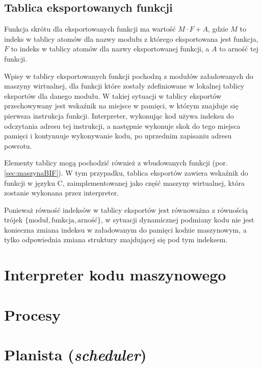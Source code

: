 \subsection{Tablica eksportowanych funkcji}
\label{sub:maszynaTablicaEksportow}

Funkcja skrótu dla eksportowanych funkcji ma wartość $M \cdot F+A$, gdzie $M$ to indeks w tablicy atomów dla nazwy modułu z którego eksportowana jest funkcja, $F$ to indeks w tablicy atomów dla nazwy eksportowanej funkcji, a $A$ to arność tej funkcji.

Wpisy w tablicy eksportowanych funkcji pochodzą z modułów załadowanych do maszyny wirtualnej, dla funkcji które zostały zdefiniowane w lokalnej tablicy eksportów dla danego modułu. W takiej sytuacji w tablicy eksportów przechowywany jest wskaźnik na miejsce w pamięci, w którym znajduje się pierwsza instrukcja funkcji. Interpreter, wykonując kod używa indeksu do odczytania adresu tej instrukcji, a następnie wykonuje skok do tego miejsca pamięci i kontynuuje wykonywanie kodu, po uprzednim zapisaniu adresu powrotu.

Elementy tablicy mogą pochodzić również z wbudowanych funkcji (por. \ref{sec:maszynaBIF}). W tym przypadku, tablica eksportów zawiera wskaźnik do funkcji w języku C, zaimplementowanej jako część maszyny wirtualnej, która zostanie wykonana przez interpreter.

Ponieważ równość indeksów w tablicy eksportów jest równoważna z równością trójek $\lbrace\text{moduł},\text{funkcja},\text{arność}\rbrace$, w sytuacji dynamicznej podmiany kodu nie jest konieczna zmiana indeksu w załadowanym do pamięci kodzie maszynowym, a tylko odpowiednia zmiana struktury znajdującej się pod tym indeksem.

\section{Interpreter kodu maszynowego}
\label{sec:maszynaInterpreter}

\section{Procesy}
\label{sec:maszynaProcesy}

\section{Planista (\emph{scheduler})}
\label{sec:maszynaScheduler}

